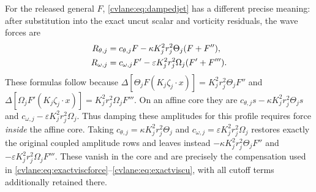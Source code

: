 For the released general $F$, \eqref{cvlane:eq:dampedjet} has a different
precise meaning: after substitution into the exact uncut scalar
and vorticity residuals, the wave forces are
\begin{align}
 R_{\theta,j}&=c_{\theta,j}F-
 \kappa K_j^2r_j^2\Theta_j(F+F''),\notag\\
 R_{\omega,j}&=c_{\omega,j}F'-
 \varepsilon K_j^2r_j^2\Omega_j(F'+F''').
 \label{cvlane:eq:dampedprofileforce}
\end{align}
These formulas follow because
$\Delta[\Theta_jF(K_j\zeta_j\cdot x)]
=K_j^2r_j^2\Theta_jF''$ and
$\Delta[\Omega_jF'(K_j\zeta_j\cdot x)]
=K_j^2r_j^2\Omega_jF'''$. On an affine core they are
$c_{\theta,j}s-\kappa K_j^2r_j^2\Theta_js$ and
$c_{\omega,j}-\varepsilon K_j^2r_j^2\Omega_j$.
Thus damping these amplitudes for this profile requires force
\emph{inside} the affine core. Taking
$c_{\theta,j}=\kappa K_j^2r_j^2\Theta_j$ and
$c_{\omega,j}=\varepsilon K_j^2r_j^2\Omega_j$ restores exactly
the original coupled amplitude rows and leaves instead
$-\kappa K_j^2r_j^2\Theta_jF''$ and
$-\varepsilon K_j^2r_j^2\Omega_jF'''$.
These vanish in the core and are precisely the compensation used
in \eqref{cvlane:eq:exactviscforce}--\eqref{cvlane:eq:exactviscu}, with all
cutoff terms additionally retained there.


